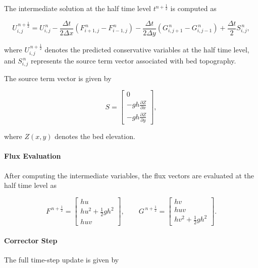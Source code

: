 \documentclass[12pt]{article}
\begin{document}
The intermediate solution at the half time level $t^{n+\frac{1}{2}}$ is computed as

\begin{equation}
U_{i,j}^{\,n+\frac{1}{2}}
=
U_{i,j}^{\,n}
-\frac{\Delta t}{2\Delta x}
\left(
F_{i+1,j}^{\,n}
-
F_{i-1,j}^{\,n}
\right)
-\frac{\Delta t}{2\Delta y}
\left(
G_{i,j+1}^{\,n}
-
G_{i,j-1}^{\,n}
\right)
+\frac{\Delta t}{2}S_{i,j}^{\,n},
\end{equation}

where $U_{i,j}^{\,n+\frac{1}{2}}$ denotes the predicted conservative variables at the half time level, and $S_{i,j}^{\,n}$ represents the source term vector associated with bed topography.

The source term vector is given by

\begin{equation}
S=
\begin{bmatrix}
0 \\
-gh\frac{\partial Z}{\partial x} \\
-gh\frac{\partial Z}{\partial y}
\end{bmatrix},
\end{equation}

where $Z(x,y)$ denotes the bed elevation.

\paragraph{Flux Evaluation}

After computing the intermediate variables, the flux vectors are evaluated at the half time level as

\begin{equation}
F^{\,n+\frac{1}{2}}
=
\begin{bmatrix}
hu \\
hu^{2}+\frac{1}{2}gh^{2} \\
huv
\end{bmatrix},
\qquad
G^{\,n+\frac{1}{2}}
=
\begin{bmatrix}
hv \\
huv \\
hv^{2}+\frac{1}{2}gh^{2}
\end{bmatrix}.
\end{equation}

\paragraph{Corrector Step}

The full time-step update is given by
\end{document}
